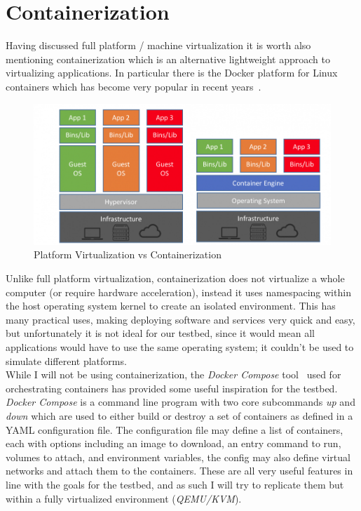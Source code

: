 \documentclass[
    author={Jacob Daniel Halsey},
    supervisor={Prof. Awais Rashid},
    degree={BSc},
    title={Building a Testbed for Evaluating Privacy Enhancing Technologies  (PETs)},
    subtitle={},
    type={software development},
    year={2021}
]{dissertation}
\begin{document}
\section{Containerization}
\label{sect:containerization}

Having discussed full platform / machine virtualization it is worth also mentioning containerization
which is an alternative lightweight approach to virtualizing applications. In particular 
there is the Docker platform for Linux containers which has become very popular in recent
years~\cite{zdnet_docker_2018}. \\

\begin{figure}
	\centering
	\includegraphics[width=12cm]{img/containers}
	\caption[]{Platform Virtualization vs Containerization\footnotemark}
	\label{containers_diagram}
\end{figure}

Unlike full platform virtualization, containerization does not virtualize a whole computer 
(or require hardware acceleration), instead it uses namespacing within the host operating 
system kernel to create an isolated environment. This has many practical uses, making deploying
software and services very quick and easy, but unfortunately it is not ideal for our testbed, since
it would mean all applications would have to use the same operating system; it couldn't be 
used to simulate different platforms. \\

While I will not be using containerization, the \emph{Docker Compose} tool~\cite{docker_compose}
used for orchestrating containers has provided some useful inspiration for the testbed.
\emph{Docker Compose} is a command line program with two core subcommands \emph{up}
and \emph{down} which are used to either build or destroy a set of containers as defined
in a YAML configuration file. The configuration file may define a list of containers, each 
with options including an image to download, an entry command to run, volumes to attach,
and environment variables, the config may also define virtual networks and attach them
to the containers. These are all very useful features in line with the goals for the testbed, and as such
I will try to replicate them but within a fully virtualized environment (\emph{QEMU/KVM}).
\end{document}
